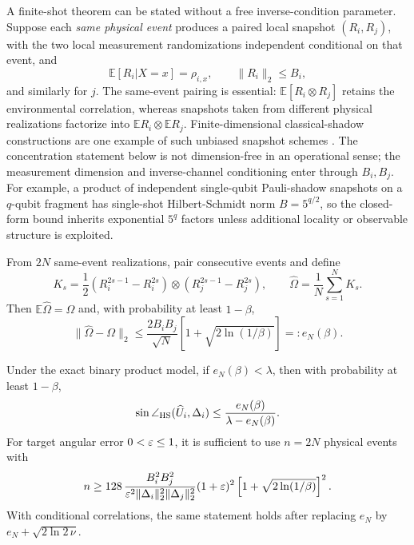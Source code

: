 A finite-shot theorem can be stated without a free inverse-condition parameter.  Suppose each \emph{same physical event} produces a paired local snapshot $(R_i,R_j)$, with the two local measurement randomizations independent conditional on that event, and
\begin{equation}
\mathbb E[R_i|X=x]=\rho_{i,x},\qquad
\|R_i\|_2\le B_i,
\end{equation}
and similarly for $j$.  The same-event pairing is essential: $\mathbb E[R_i\otimes R_j]$ retains the environmental correlation, whereas snapshots taken from different physical realizations factorize into $\mathbb E R_i\otimes\mathbb E R_j$.  Finite-dimensional classical-shadow constructions are one example of such unbiased snapshot schemes \cite{huang2020}.  The concentration statement below is not dimension-free in an operational sense; the measurement dimension and inverse-channel conditioning enter through $B_i,B_j$.  For example, a product of independent single-qubit Pauli-shadow snapshots on a $q$-qubit fragment has single-shot Hilbert-Schmidt norm $B=5^{q/2}$, so the closed-form bound inherits exponential $5^q$ factors unless additional locality or observable structure is exploited.

From $2N$ same-event realizations, pair consecutive events and define
\begin{equation}
K_s=\frac12(R_i^{2s-1}-R_i^{2s})\otimes(R_j^{2s-1}-R_j^{2s}),
\qquad
\widehat\Omega=\frac1N\sum_{s=1}^{N}K_s.
\end{equation}
Then $\mathbb E\widehat\Omega=\Omega$ and, with probability at least $1-\beta$,
\begin{equation}
\|\widehat\Omega-\Omega\|_2\le
\frac{2B_iB_j}{\sqrt N}\left[1+\sqrt{2\ln(1/\beta)}\right]
=:e_N(\beta).
\label{eq:finite-omega}
\end{equation}

\begin{theorem}
\label{thm:finite-binary}
Under the exact binary product model, if $e_N(\beta)<\lambda$, then with probability at least $1-\beta$,
\begin{equation}
\sin\angle_{\rm HS}(\widehat U_i,\Delta_i)
\le\frac{e_N(\beta)}{\lambda-e_N(\beta)}.
\end{equation}
For target angular error $0<\varepsilon\le1$, it is sufficient to use $n=2N$ physical events with
\begin{equation}
 n\ge128\,
\frac{B_i^2B_j^2}{\varepsilon^2\|\Delta_i\|_2^2\|\Delta_j\|_2^2}
(1+\varepsilon)^2
\left[1+\sqrt{2\ln(1/\beta)}\right]^2.
\label{eq:finite-binary-n}
\end{equation}
With conditional correlations, the same statement holds after replacing $e_N$ by $e_N+\sqrt{2\ln2\,\nu}$.
\end{theorem}


